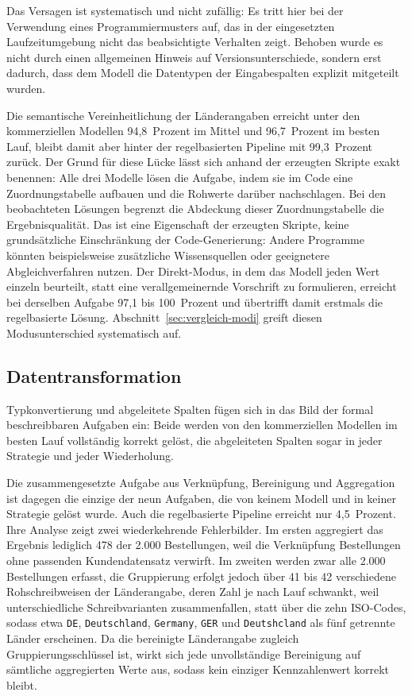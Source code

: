 Das Versagen ist systematisch und nicht zufällig: Es tritt hier bei der Verwendung eines Programmiermusters auf, das in der eingesetzten Laufzeitumgebung nicht das beabsichtigte Verhalten zeigt. Behoben wurde es nicht durch einen allgemeinen Hinweis auf Versionsunterschiede, sondern erst dadurch, dass dem Modell die Datentypen der Eingabespalten explizit mitgeteilt wurden.

Die semantische Vereinheitlichung der Länderangaben erreicht unter den kommerziellen Modellen 94,8~Prozent im Mittel und 96,7~Prozent im besten Lauf, bleibt damit aber hinter der regelbasierten Pipeline mit 99,3~Prozent zurück. Der Grund für diese Lücke lässt sich anhand der erzeugten Skripte exakt benennen: Alle drei Modelle lösen die Aufgabe, indem sie im Code eine Zuordnungstabelle aufbauen und die Rohwerte darüber nachschlagen. Bei den beobachteten Lösungen begrenzt die Abdeckung dieser Zuordnungstabelle die Ergebnisqualität. Das ist eine Eigenschaft der erzeugten Skripte, keine grundsätzliche Einschränkung der Code-Generierung: Andere Programme könnten beispielsweise zusätzliche Wissensquellen oder geeignetere Abgleichverfahren nutzen. Der Direkt-Modus, in dem das Modell jeden Wert einzeln beurteilt, statt eine verallgemeinernde Vorschrift zu formulieren, erreicht bei derselben Aufgabe 97,1 bis 100~Prozent und übertrifft damit erstmals die regelbasierte Lösung. Abschnitt~\ref{sec:vergleich-modi} greift diesen Modusunterschied systematisch auf.

\subsection{Datentransformation}
\label{subsec:ergebnisse-transformation}

Typkonvertierung und abgeleitete Spalten fügen sich in das Bild der formal beschreibbaren Aufgaben ein: Beide werden von den kommerziellen Modellen im besten Lauf vollständig korrekt gelöst, die abgeleiteten Spalten sogar in jeder Strategie und jeder Wiederholung.

Die zusammengesetzte Aufgabe aus Verknüpfung, Bereinigung und Aggregation ist dagegen die einzige der neun Aufgaben, die von keinem Modell und in keiner Strategie gelöst wurde. Auch die regelbasierte Pipeline erreicht nur 4,5~Prozent. Ihre Analyse zeigt zwei wiederkehrende Fehlerbilder. Im ersten aggregiert das Ergebnis lediglich 478 der 2.000 Bestellungen, weil die Verknüpfung Bestellungen ohne passenden Kundendatensatz verwirft. Im zweiten werden zwar alle 2.000 Bestellungen erfasst, die Gruppierung erfolgt jedoch über 41 bis 42 verschiedene Rohschreibweisen der Länderangabe, deren Zahl je nach Lauf schwankt, weil unterschiedliche Schreibvarianten zusammenfallen, statt über die zehn ISO-Codes, sodass etwa \texttt{DE}, \texttt{Deutschland}, \texttt{Germany}, \texttt{GER} und \texttt{Deutshcland} als fünf getrennte Länder erscheinen. Da die bereinigte Länderangabe zugleich Gruppierungsschlüssel ist, wirkt sich jede unvollständige Bereinigung auf sämtliche aggregierten Werte aus, sodass kein einziger Kennzahlenwert korrekt bleibt.

